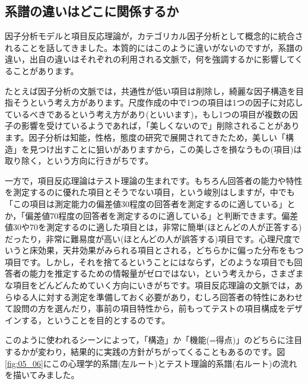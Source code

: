 \documentclass{ltjsbook}
\begin{document}
\subsection{系譜の違いはどこに関係するか}

因子分析モデルと項目反応理論が，カテゴリカル因子分析として概念的に統合されることを話してきました。本質的にはこのように違いがないのですが，系譜の違い，出自の違いはそれぞれの利用される文脈で，何を強調するかに影響してくることがあります。

たとえば因子分析の文脈では，共通性が低い項目は削除し，綺麗な因子構造を目指そうという考え方があります。尺度作成の中で1つの項目は1つの因子に対応しているべきであるという考え方があり(といいます)，もし1つの項目が複数の因子の影響を受けているようであれば，「美しくないので」削除されることがあります。因子分析は知能，性格，態度の研究で展開されてきたため，美しい「構造」を見つけ出すことに狙いがありますから，この美しさを損なうもの(項目)は取り除く，という方向に行きがちです。

一方で，項目反応理論はテスト理論の生まれです。もちろん回答者の能力や特性を測定するのに優れた項目とそうでない項目，という峻別はしますが，中でも「この項目は測定能力の偏差値30程度の回答者を測定するのに適している」とか，「偏差値70程度の回答者を測定するのに適している」と判断できます。偏差値30や70を測定するのに適した項目とは，非常に簡単(ほとんどの人が正答する)だったり，非常に難易度が高い(ほとんどの人が誤答する)項目です。心理尺度でいうと床効果，天井効果がみられる項目とされる，どちらかに偏った分布をもつ項目です。しかし，それを捨てるということにはならず，どのような項目でも回答者の能力を推定するための情報量がゼロではない，という考えから，さまざまな項目をどんどんためていく方向にいきがちです。項目反応理論の文脈では，あらゆる人に対する測定を準備しておく必要があり，むしろ回答者の特性にあわせて設問の方を選んだり，事前の項目特性から，前もってテストの項目構成をデザインする，ということを目的とするのです。

このように使われるシーンによって，「構造」か「機能(=得点)」のどちらに注目するかが変わり，結果的に実践の方針がちがってくることもあるのです。図\ref{fig:05_06}にこの心理学的系譜(左ルート)とテスト理論的系譜(右ルート)の流れを描いてみました。
\end{document}

